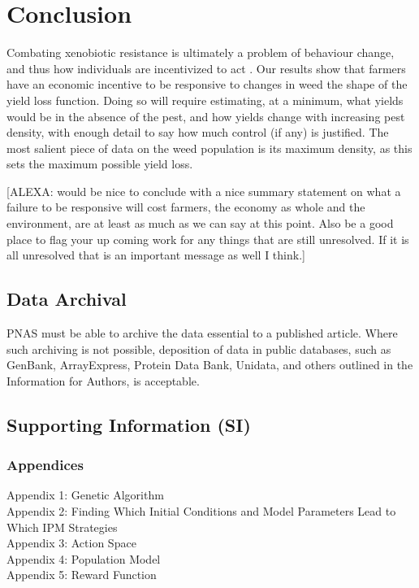 \documentclass[9pt,twocolumn,twoside,lineno]{pnas-new}
\begin{document}
\section*{Conclusion}
Combating xenobiotic resistance is ultimately a problem of behaviour change, and thus how individuals are incentivized to act \citep{Hurl2016}. Our results show that farmers have an economic incentive to be responsive to changes in weed the shape of the yield loss function. Doing so will require estimating, at a minimum, what yields would be in the absence of the pest, and how yields change with increasing pest density, with enough detail to say how much control (if any) is justified. The most salient piece of data on the weed population is its maximum density, as this sets the maximum possible yield loss.      

[ALEXA: would be nice to conclude with a nice summary statement on what a failure to be responsive will cost farmers, the economy as whole and the environment, are at least as much as we can say at this point. Also be a good place to flag your up coming work for any things that are still unresolved. If it is all unresolved that is an important message as well I think.] 

\subsection*{Data Archival}

PNAS must be able to archive the data essential to a published article. Where such archiving is not possible, deposition of data in public databases, such as GenBank, ArrayExpress, Protein Data Bank, Unidata, and others outlined in the Information for Authors, is acceptable.

\subsection*{Supporting Information (SI)}
\subsubsection*{Appendices}
Appendix 1: Genetic Algorithm\\
Appendix 2: Finding Which Initial Conditions and Model Parameters Lead to Which IPM Strategies\\
Appendix 3: Action Space\\
Appendix 4: Population Model\\
Appendix 5: Reward Function\\
\end{document}
